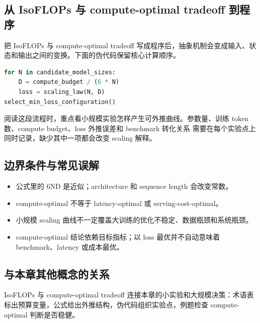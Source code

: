 \documentclass[a4paper]{article}
\begin{document}
\subsection{从 IsoFLOPs 与 compute-optimal tradeoff 到程序}
把 IsoFLOPs 与 compute-optimal tradeoff 写成程序后，抽象机制会变成输入、状态和输出之间的变换。下面的伪代码保留核心计算顺序。
\begin{lstlisting}[language=Python]
for N in candidate_model_sizes:
    D = compute_budget / (6 * N)
    loss = scaling_law(N, D)
select_min_loss_configuration()
\end{lstlisting}
阅读这段流程时，重点看小规模实验怎样产生可外推曲线。参数量、训练 token 数、compute budget、loss 外推误差和 benchmark 转化关系 需要在每个实验点上同时记录，缺少其中一项都会改变 scaling 解释。
\subsection{边界条件与常见误解}
\begin{itemize}
\item 公式里的 6ND 是近似；architecture 和 sequence length 会改变常数。
\item compute-optimal 不等于 latency-optimal 或 serving-cost-optimal。
\item 小规模 scaling 曲线不一定覆盖大训练的优化不稳定、数据瓶颈和系统瓶颈。
\item compute-optimal 结论依赖目标指标；以 loss 最优并不自动意味着 benchmark、latency 或成本最优。
\end{itemize}
\subsection{与本章其他概念的关系}
IsoFLOPs 与 compute-optimal tradeoff 连接本章的小实验和大规模决策：术语表标出预算变量，公式给出外推结构，伪代码组织实验点，例题检查 compute-optimal 判断是否稳健。
\end{document}
